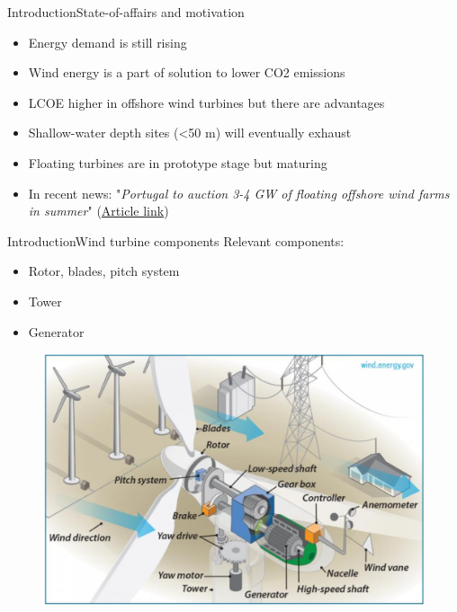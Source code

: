 \begin{frame}{Introduction}{State-of-affairs and motivation}
	\begin{itemize}
		\item Energy demand is still rising
		\item Wind energy is a part of solution to lower CO2 emissions
		\item LCOE higher in offshore wind turbines but there are advantages
		\item Shallow-water depth sites (<50 m) will eventually exhaust
		\item Floating turbines are in prototype stage but maturing
		\item In recent news: "\textit{Portugal to auction 3-4 GW of floating offshore wind farms in summer}" (\href{https://www.reuters.com/business/energy/portugal-auction-3-4-gw-floating-offshore-wind-farms-summer-2022-03-16/}{Article link})
	\end{itemize}\bigskip
\end{frame}


\begin{frame}{Introduction}{Wind turbine components}
	Relevant components:
	\begin{itemize}
		\item Rotor, blades, pitch system
		\item Tower
		\item Generator
	\end{itemize}
	\begin{figure}[ht]
		\centering
		\includegraphics[width=0.7\linewidth]{../Graphics/WtComponents.png}
		\label{fig:wt_components}
	\end{figure}

\end{frame}


